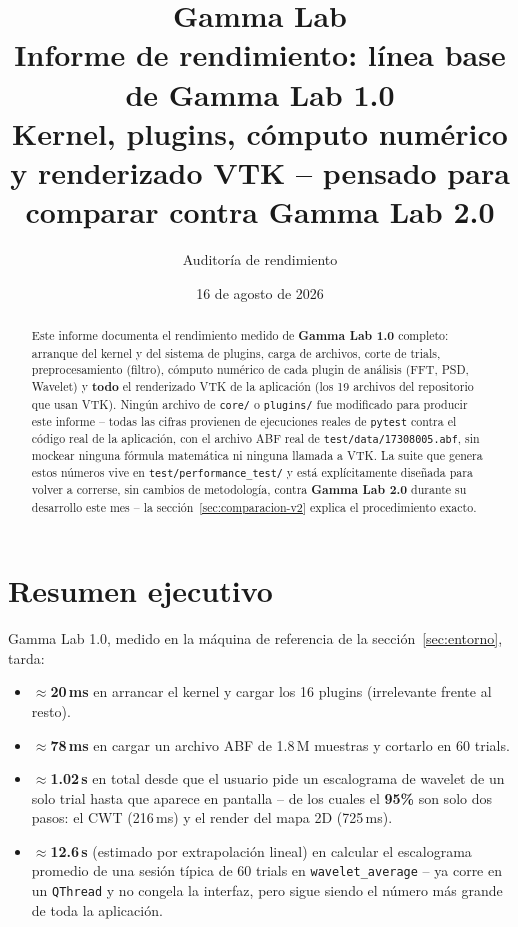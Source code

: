 \documentclass[11pt,a4paper]{article}
\title{\textbf{Gamma Lab}\\[4pt]\large Informe de rendimiento: línea base de Gamma Lab 1.0\\
\large Kernel, plugins, cómputo numérico y renderizado VTK -- pensado para comparar contra Gamma Lab 2.0}
\author{Auditoría de rendimiento}
\date{16 de agosto de 2026}
\begin{document}
\maketitle
\thispagestyle{empty}

\begin{abstract}
\noindent
Este informe documenta el rendimiento medido de \textbf{Gamma Lab 1.0} completo: arranque del kernel y del
sistema de plugins, carga de archivos, corte de trials, preprocesamiento (filtro), cómputo numérico de cada
plugin de análisis (FFT, PSD, Wavelet) y \textbf{todo} el renderizado VTK de la aplicación (los 19 archivos
del repositorio que usan VTK). Ningún archivo de \texttt{core/} o \texttt{plugins/} fue modificado para
producir este informe -- todas las cifras provienen de ejecuciones reales de \texttt{pytest} contra el
código real de la aplicación, con el archivo ABF real de \texttt{test/data/17308005.abf}, sin mockear
ninguna fórmula matemática ni ninguna llamada a VTK. La suite que genera estos números vive en
\texttt{test/performance\_\allowbreak test/} y está explícitamente diseñada para volver a correrse, sin
cambios de metodología, contra \textbf{Gamma Lab 2.0} durante su desarrollo este mes -- la
sección~\ref{sec:comparacion-v2} explica el procedimiento exacto.
\end{abstract}

\tableofcontents
\newpage

\section{Resumen ejecutivo}

Gamma Lab 1.0, medido en la máquina de referencia de la sección~\ref{sec:entorno}, tarda:

\begin{itemize}[nosep]
  \item \textbf{$\approx$20\,ms} en arrancar el kernel y cargar los 16 plugins (irrelevante frente al resto).
  \item \textbf{$\approx$78\,ms} en cargar un archivo ABF de 1.8\,M muestras y cortarlo en 60 trials.
  \item \textbf{$\approx$1.02\,s} en total desde que el usuario pide un escalograma de wavelet de un solo
        trial hasta que aparece en pantalla -- de los cuales el \textbf{95\%} son solo dos pasos: el CWT
        (216\,ms) y el render del mapa 2D (725\,ms).
  \item \textbf{$\approx$12.6\,s} (estimado por extrapolación lineal) en calcular el escalograma promedio de
        una sesión típica de 60 trials en \texttt{wavelet\_\allowbreak average} -- ya corre en un
        \texttt{QThread} y no congela la interfaz, pero sigue siendo el número más grande de toda la
        aplicación.
\end{itemize}
\end{document}
